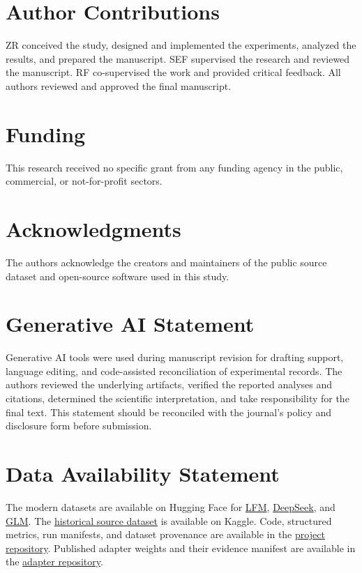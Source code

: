 \documentclass[utf8]{FrontiersinHarvard}
\begin{document}
\section*{Author Contributions}
ZR conceived the study, designed and implemented the experiments, analyzed the results, and prepared the manuscript. SEF supervised the research and reviewed the manuscript. RF co-supervised the work and provided critical feedback. All authors reviewed and approved the final manuscript.

\section*{Funding}
This research received no specific grant from any funding agency in the public, commercial, or not-for-profit sectors.

\section*{Acknowledgments}
The authors acknowledge the creators and maintainers of the public source dataset and open-source software used in this study.

\section*{Generative AI Statement}
Generative AI tools were used during manuscript revision for drafting support, language editing, and code-assisted reconciliation of experimental records. The authors reviewed the underlying artifacts, verified the reported analyses and citations, determined the scientific interpretation, and take responsibility for the final text. This statement should be reconciled with the journal's policy and disclosure form before submission.

\section*{Data Availability Statement}
The modern datasets are available on Hugging Face for \href{https://huggingface.co/datasets/Flowerly/modern-fake-reviews-lfm}{LFM}, \href{https://huggingface.co/datasets/Flowerly/modern-fake-reviews}{DeepSeek}, and \href{https://huggingface.co/datasets/Flowerly/modern-fake-reviews-glm}{GLM}. The \href{https://www.kaggle.com/datasets/mexwell/fake-reviews-dataset}{historical source dataset} is available on Kaggle. Code, structured metrics, run manifests, and dataset provenance are available in the \href{https://github.com/PurplexyFlower/Fake-review}{project repository}. Published adapter weights and their evidence manifest are available in the \href{https://huggingface.co/KandirResearch/fake-review-rs-qlora-adapters}{adapter repository}.



\end{document}
